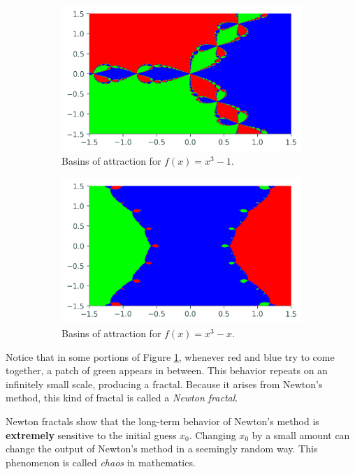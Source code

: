 \begin{figure}[H]
\centering
\begin{subfigure}{.49\textwidth}
    \centering
    \includegraphics[width=\textwidth]{figures/fractal_hw.png}
    \caption{Basins of attraction for $f(x) = x^3-1$.}
    \label{fig:fractal_hw}
\end{subfigure}
\begin{subfigure}{.49\textwidth}
    \centering
    \includegraphics[width=\textwidth]{figures/fractal_ex.png}
    \caption{Basins of attraction for $f(x) = x^3-x$.}
    \label{fig:fractal_ex}
\end{subfigure}
\caption{}
\label{fig:newton-basins}
\end{figure}

\begin{info} %
Notice that in some portions of Figure \ref{fig:fractal_hw}, whenever red and blue try to come together, a patch of green appears in between.
This behavior repeats on an infinitely small scale, producing a fractal.
Because it arises from Newton's method, this kind of fractal is called a \emph{Newton fractal}.

Newton fractals show that the long-term behavior of Newton's method is \textbf{extremely} sensitive to the initial guess $x_0$.
Changing $x_0$ by a small amount can change the output of Newton's method in a seemingly random way.
This phenomenon is called \emph{chaos} in mathematics.
\end{info}

